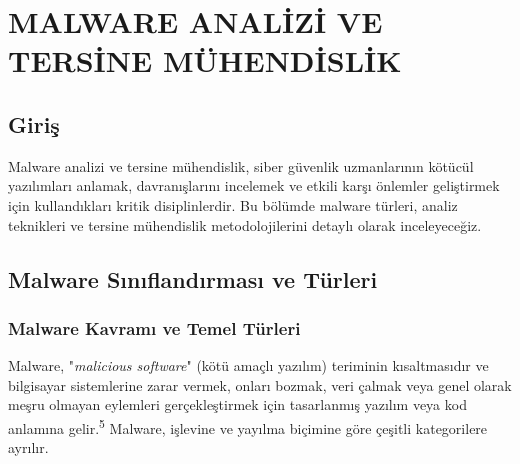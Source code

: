 \chapter{MALWARE ANALİZİ VE TERSİNE MÜHENDİSLİK}

\section*{Giriş}
Malware analizi ve tersine mühendislik, siber güvenlik uzmanlarının kötücül yazılımları anlamak, davranışlarını incelemek ve etkili karşı önlemler geliştirmek için kullandıkları kritik disiplinlerdir. Bu bölümde malware türleri, analiz teknikleri ve tersine mühendislik metodolojilerini detaylı olarak inceleyeceğiz.

\section{Malware Sınıflandırması ve Türleri}

\subsection{Malware Kavramı ve Temel Türleri}

Malware, "\textit{malicious software}" (kötü amaçlı yazılım) teriminin kısaltmasıdır ve bilgisayar sistemlerine zarar vermek, onları bozmak, veri çalmak veya genel olarak meşru olmayan eylemleri gerçekleştirmek için tasarlanmış yazılım veya kod anlamına gelir.\textsuperscript{5} Malware, işlevine ve yayılma biçimine göre çeşitli kategorilere ayrılır.

